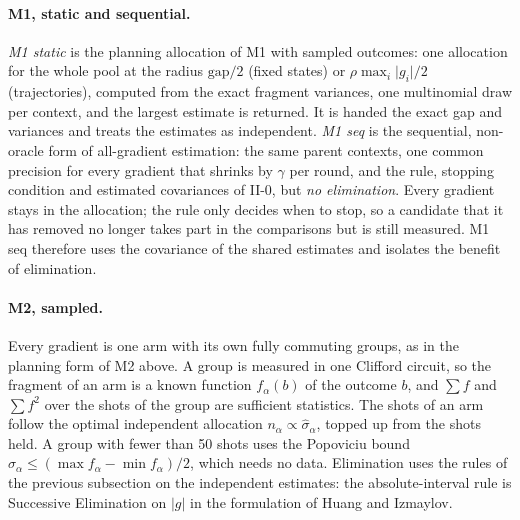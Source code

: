 \documentclass[aps,pra,reprint,superscriptaddress,nofootinbib]{revtex4-2}
\begin{document}
\paragraph{M1, static and sequential.} \emph{M1 static} is the planning allocation of M1 with sampled outcomes: one allocation for the whole pool at the radius $\mathrm{gap}/2$ (fixed states) or $\rho\max_i\lvert g_i\rvert/2$ (trajectories), computed from the exact fragment variances, one multinomial draw per context, and the largest estimate is returned. It is handed the exact gap and variances and treats the estimates as independent. \emph{M1 seq} is the sequential, non-oracle form of all-gradient estimation: the same parent contexts, one common precision for every gradient that shrinks by $\gamma$ per round, and the rule, stopping condition and estimated covariances of II-0, but \emph{no elimination}. Every gradient stays in the allocation; the rule only decides when to stop, so a candidate that it has removed no longer takes part in the comparisons but is still measured. M1 seq therefore uses the covariance of the shared estimates and isolates the benefit of elimination.

\paragraph{M2, sampled.} Every gradient is one arm with its own fully commuting groups, as in the planning form of M2 above. A group is measured in one Clifford circuit, so the fragment of an arm is a known function $f_\alpha(b)$ of the outcome $b$, and $\sum f$ and $\sum f^2$ over the shots of the group are sufficient statistics. The shots of an arm follow the optimal independent allocation $n_\alpha\propto\hat\sigma_\alpha$, topped up from the shots held. A group with fewer than 50 shots uses the Popoviciu bound $\sigma_\alpha\le(\max f_\alpha-\min f_\alpha)/2$, which needs no data. Elimination uses the rules of the previous subsection on the independent estimates: the absolute-interval rule is Successive Elimination on $\lvert g\rvert$ in the formulation of Huang and Izmaylov.
\end{document}
